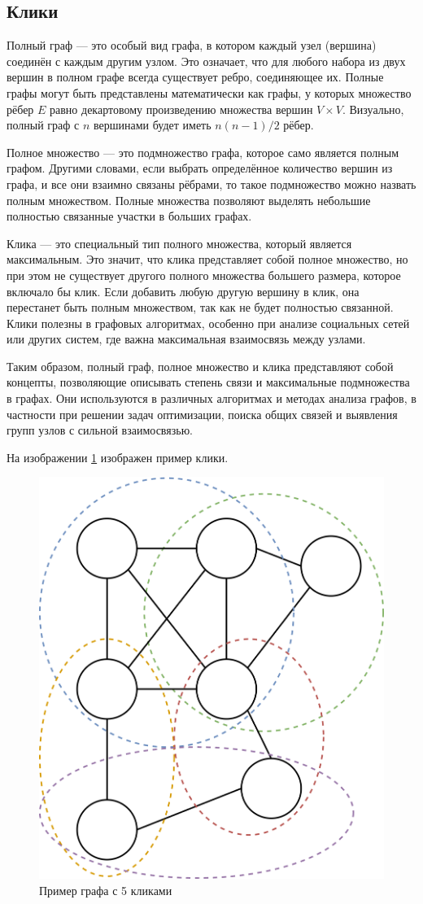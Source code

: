 \subsection{Клики}


Полный граф — это особый вид графа, в котором каждый узел (вершина) соединён с каждым другим узлом. Это означает, что для любого набора из двух вершин в полном графе всегда существует ребро, соединяющее их. Полные графы могут быть представлены математически как графы, у которых множество рёбер $E$ равно декартовому произведению множества вершин $V \times V$. Визуально, полный граф с $n$ вершинами будет иметь $n(n-1)/2$ рёбер.

Полное множество — это подмножество графа, которое само является полным графом. Другими словами, если выбрать определённое количество вершин из графа, и все они взаимно связаны рёбрами, то такое подмножество можно назвать полным множеством. Полные множества позволяют выделять небольшие полностью связанные участки в больших графах.

Клика — это специальный тип полного множества, который является максимальным. Это значит, что клика представляет собой полное множество, но при этом не существует другого полного множества большего размера, которое включало бы клик. Если добавить любую другую вершину в клик, она перестанет быть полным множеством, так как не будет полностью связанной. Клики полезны в графовых алгоритмах, особенно при анализе социальных сетей или других систем, где важна максимальная взаимосвязь между узлами.

Таким образом, полный граф, полное множество и клика представляют собой концепты, позволяющие описывать степень связи и максимальные подмножества в графах. Они используются в различных алгоритмах и методах анализа графов, в частности при решении задач оптимизации, поиска общих связей и выявления групп узлов с сильной взаимосвязью.

На изображении \ref{fig:clique_example} изображен пример клики.

\begin{figure}[H]
	\begin{center}
		\includegraphics[width=0.40\linewidth]{src/img/1/clique.png}
		\caption{Пример графа с 5 кликами}
		\label{fig:clique_example}
	\end{center}
\end{figure}

